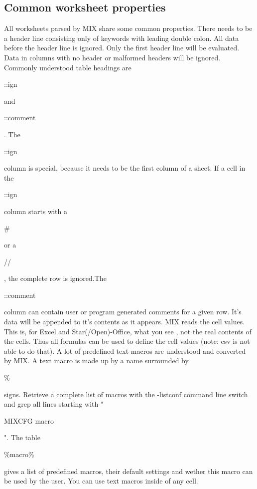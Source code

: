 \documentclass[a4paper,12pt]{article}
\begin{document}
\subsection{Common worksheet properties}
All worksheets parsed by MIX share some common properties.
There needs to be a header line consisting only of keywords with leading double colon. All data before the header line is ignored. Only the first header line will be evaluated. Data in columns with no header or malformed headers will be ignored.\newline
Commonly understood table headings are \begin{tt}::ign\end{tt} and \begin{tt}::comment\end{tt}. The \begin{tt}::ign\end{tt} column is special, because it needs to be the first column of a sheet. If a cell in the \begin{tt}::ign\end{tt} column starts with a \begin{tt}\#\end{tt} or a \begin{tt}//\end{tt}, the complete row is ignored.The \begin{tt}::comment\end{tt} column can contain user or program generated comments for a given row. It's data will be appended to it's contents as it appears.\newline
MIX reads the cell values. This is, for Excel and Star(/Open)-Office, what you see , not the real contents of the cells. Thus all formulas can be used to define the cell values (note: csv is not able to do that).\newline
A lot of predefined text macros are understood and converted by MIX. A text macro is made up by a name surrounded by \begin{tt}\%\end{tt} signs. Retrieve a complete list of macros with the -listconf command line switch and grep all lines starting with "\begin{tt}MIXCFG macro\end{tt}". The table \begin{tt}\%macro\%\end{tt} gives a list of predefined macros, their default settings and wether this macro can be used by the user. You can use text macros inside of any cell.\\
\end{document}

